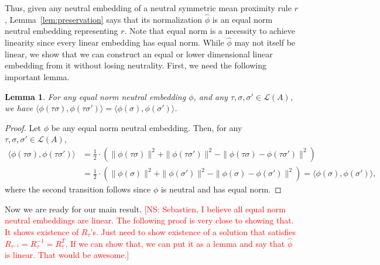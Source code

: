 \documentclass[10pt,letterpaper]{article}
\newcommand{\calL}{{\mathcal{L}}}
\newcommand{\rank}{{\calL(A)}}
\newtheorem{lemma}{Lemma}
\newcommand{\kibitz}[2]{\ifnum\Comments=1\textcolor{#1}{#2}\fi}
\newcommand{\cns}[1]{\kibitz{red} {[NS: #1]}}
\begin{document}
Thus, given any neutral embedding of a neutral symmetric mean proximity rule $r$, Lemma~\ref{lem:preservation} says that its normalization $\hat{\phi}$ is an equal norm neutral embedding representing $r$. Note that equal norm is a necessity to achieve linearity since every linear embedding has equal norm. While $\hat{\phi}$ may not itself be linear, we show that we can construct an equal or lower dimensional linear embedding from it without losing neutrality. First, we need the following important lemma. 

\begin{lemma}
For any equal norm neutral embedding $\phi$, and any $\tau,\sigma,\sigma' \in \rank$, we have $\langle \phi(\tau \sigma), \phi(\tau \sigma') \rangle = \langle \phi(\sigma), \phi(\sigma') \rangle$.
\label{lem:inner-product-preserve}
\end{lemma}
\begin{proof}
Let $\phi$ be any equal norm neutral embedding. Then, for any $\tau,\sigma,\sigma' \in \rank$,
\begin{align*}
\langle \phi(\tau \sigma), \phi(\tau \sigma') \rangle &= \frac{1}{2} \cdot \left(\|\phi(\tau \sigma)\|^2 + \|\phi(\tau \sigma')\|^2  - \|\phi(\tau \sigma) - \phi(\tau \sigma')\|^2\right) \\
&= \frac{1}{2} \cdot \left(\|\phi(\sigma)\|^2 + \|\phi(\sigma')\|^2 - \|\phi(\sigma) - \phi(\sigma')\|^2\right) = \langle \phi(\sigma), \phi(\sigma') \rangle,
\end{align*}
where the second transition follows since $\phi$ is neutral and has equal norm.
\end{proof}

Now we are ready for our main result. \cns{Sebastien, I believe all equal norm neutral embeddings are linear. The following proof is very close to showing that. It shows existence of $R_{\tau}$'s. Just need to show existence of a solution that satisfies $R_{\tau^{-1}} = R_{\tau}^{-1} = R_{\tau}^T$. If we can show that, we can put it as a lemma and say that $\hat{\phi}$ is linear. That would be awesome.} 

\end{document}
